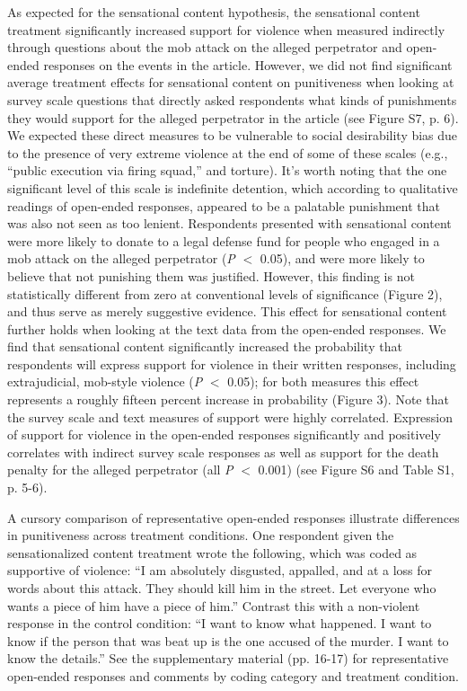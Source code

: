 As expected for the sensational content hypothesis, the sensational content treatment significantly increased support for violence when measured indirectly through questions about the mob attack on the alleged perpetrator and open-ended responses on the events in the article. However, we did not find significant average treatment effects for sensational content on punitiveness when looking at survey scale questions that directly asked respondents what kinds of punishments they would support for the alleged perpetrator in the article (see Figure S7, p. 6). We expected these direct measures to be vulnerable to social desirability bias due to the presence of very extreme violence at the end of some of these scales (e.g., ``public execution via firing squad,'' and torture). It's worth noting that the one significant level of this scale is indefinite detention, which according to qualitative readings of open-ended responses, appeared to be a palatable punishment that was also not seen as too lenient. Respondents presented with sensational content were more likely to donate to a legal defense fund for people who engaged in a mob attack on the alleged perpetrator (\textit{P} $<$ 0.05), and were more likely to believe that not punishing them was justified. However, this finding is not statistically different from zero at conventional levels of significance (Figure 2), and thus serve as merely suggestive evidence. This effect for sensational content further holds when looking at the text data from the open-ended responses. We find that sensational content significantly increased the probability that respondents will express support for violence in their written responses, including extrajudicial, mob-style violence (\textit{P} $<$ 0.05); for both measures this effect represents a roughly fifteen percent increase in probability (Figure 3). Note that the survey scale and text measures of support were highly correlated. Expression of support for violence in the open-ended responses significantly and positively correlates with indirect survey scale responses as well as support for the death penalty for the alleged perpetrator (all \textit{P} $<$ 0.001) (see Figure S6 and Table S1, p. 5-6).

A cursory comparison of representative open-ended responses illustrate differences in punitiveness across treatment conditions. One respondent given the sensationalized content treatment wrote the following, which was coded as supportive of violence: ``I am absolutely disgusted, appalled, and at a loss for words about this attack.  They should kill him in the street. Let everyone who wants a piece of him have a piece of him.'' Contrast this with a non-violent response in the control condition: ``I want to know what happened. I want to know if the person that was beat up is the one accused of the murder. I want to know the details.'' See the supplementary material (pp. 16-17) for representative open-ended responses and comments by coding category and treatment condition.

